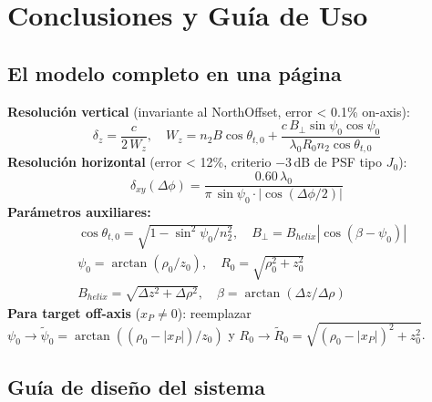 \documentclass[12pt,a4paper,oneside]{book}
\newcommand{\result}[2]{%
  \begin{tcolorbox}[enhanced, breakable,
    colback=yellow!8, colframe=orange!70!black,
    fonttitle=\bfseries,
    title={\protect#1},
    attach boxed title to top left={yshift=-2mm, xshift=5mm},
    boxed title style={colback=orange!70!black}]
    #2
  \end{tcolorbox}}
\begin{document}
\chapter{Conclusiones y Guía de Uso}

\section{El modelo completo en una página}

\result{Ecuaciones Finales — SAR Biestático Helicoidal en Dos Medios}{
\textbf{Resolución vertical} (invariante al NorthOffset, error < 0.1\% on-axis):
\[
\delta_z = \frac{c}{2\,W_z}, \quad W_z = n_2 B\cos\theta_{t,0} + \frac{c\,B_\perp\sin\psi_0\cos\psi_0}{\lambda_0 R_0 n_2\cos\theta_{t,0}}
\]
\vspace{4pt}
\textbf{Resolución horizontal} (error < 12\%, criterio $-3\,\text{dB}$ de PSF tipo $J_0$):
\[
\delta_{xy}(\Delta\phi) = \frac{0.60\,\lambda_0}{\pi\,\sin\psi_0\cdot|\cos(\Delta\phi/2)|}
\]
\vspace{4pt}
\textbf{Parámetros auxiliares:}
\begin{align*}
&\cos\theta_{t,0} = \sqrt{1-\sin^2\psi_0/n_2^2}, \quad B_\perp = B_{helix}|\cos(\beta-\psi_0)| \\
&\psi_0 = \arctan(\rho_0/z_0), \quad R_0 = \sqrt{\rho_0^2+z_0^2} \\
&B_{helix} = \sqrt{\Delta z^2+\Delta\rho^2}, \quad \beta = \arctan(\Delta z/\Delta\rho)
\end{align*}
\vspace{4pt}
\textbf{Para target off-axis} ($x_P \neq 0$): reemplazar $\psi_0 \to \tilde{\psi}_0 = \arctan((\rho_0-|x_P|)/z_0)$ y $R_0 \to \tilde{R}_0 = \sqrt{(\rho_0-|x_P|)^2+z_0^2}$.
}

\section{Guía de diseño del sistema}
\end{document}
